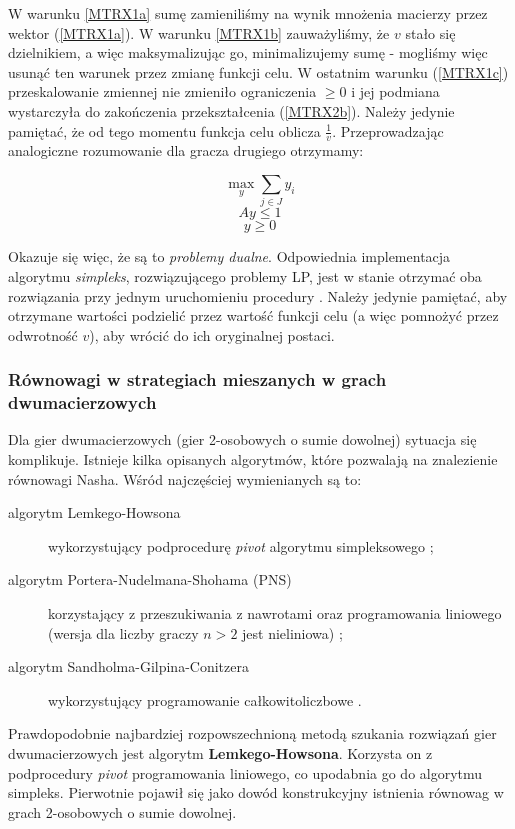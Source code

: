 \documentclass[polish]{standalone}
\begin{document}
W warunku \ref{MTRX1a} sumę zamieniliśmy na wynik mnożenia macierzy przez wektor (\ref{MTRX1a}). W warunku \ref{MTRX1b}
zauważyliśmy, że $v$ stało się dzielnikiem, a więc maksymalizując go, minimalizujemy sumę - mogliśmy więc usunąć ten
warunek przez zmianę funkcji celu. W ostatnim warunku (\ref{MTRX1c}) przeskalowanie zmiennej nie zmieniło ograniczenia
$\geq 0$ i jej podmiana wystarczyła do zakończenia przekształcenia (\ref{MTRX2b}). Należy jedynie pamiętać, że od tego
momentu funkcja celu oblicza $\frac{1}{v}$. Przeprowadzając analogiczne rozumowanie dla gracza drugiego otrzymamy:

$$\max_y \sum_{j \in J} y_i$$
$$Ay \leq 1 $$
$$y \geq 0$$

Okazuje się więc, że są to \textit{problemy dualne}. \cite[str.~42--47]{O-GT} Odpowiednia implementacja algorytmu
\textit{simpleks}, rozwiązującego problemy LP, jest w stanie otrzymać oba rozwiązania przy jednym uruchomieniu
procedury \cite[str.~49--61]{O-GT}. Należy jedynie pamiętać, aby otrzymane wartości podzielić przez wartość funkcji
celu (a więc pomnożyć przez odwrotność $v$), aby wrócić do ich oryginalnej postaci.

\subsubsection{Równowagi w strategiach mieszanych w grach dwumacierzowych}

Dla gier dwumacierzowych (gier 2-osobowych o sumie dowolnej) sytuacja się komplikuje. Istnieje
kilka opisanych algorytmów, które pozwalają na znalezienie równowagi Nasha. Wśród najczęściej wymienianych są to:
\begin{description}
\item[algorytm Lemkego-Howsona] wykorzystujący podprocedurę \textit{pivot} algorytmu simpleksowego \cite{LH-NE};
\item[algorytm Portera-Nudelmana-Shohama (PNS)] korzystający z przeszukiwania z nawrotami oraz programowania liniowego
(wersja dla liczby graczy $n > 2$ jest nieliniowa) \cite{PNS-NE};
\item[algorytm Sandholma-Gilpina-Conitzera] wykorzystujący programowanie całkowitoliczbowe \cite{SCG-NE}.
\end{description}

Prawdopodobnie najbardziej rozpowszechnioną metodą szukania rozwiązań gier dwumacierzowych jest algorytm
\textbf{Lemkego-Howsona}\cite{LH-NE}. Korzysta on z podprocedury \textit{pivot} programowania liniowego, co upodabnia
go do algorytmu simpleks. Pierwotnie pojawił się jako dowód konstrukcyjny istnienia równowag w grach 2-osobowych o sumie
dowolnej.
\end{document}
